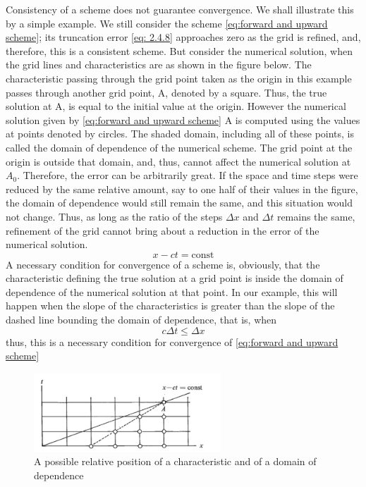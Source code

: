 Consistency of a scheme does not guarantee conver­gence. We shall illustrate this by a simple example. We still consider the scheme \ref{eq:forward and upward scheme}; its truncation error \ref{eq: 2.4.8} approaches zero as the grid is refined, and, there­fore, this is a consistent scheme. But consider the numerical solution, when the grid lines and character­istics are as shown in the figure below. The characteristic passing through the grid point taken as the origin in this example passes through another grid point, A, denoted by a square. Thus, the true solution at A, is equal to the initial value at the origin. However the numerical solution given by \ref{eq:forward and upward scheme} A is computed using the values at points denoted by circles. The shaded domain, including all of these points, is called the domain of dependence of the numerical scheme. The grid point at the origin is outside that domain, and, thus, cannot affect the numerical solution at $A_0$. Therefore, the error can be arbitrarily great. If the space and time steps were reduced by the same relative amount, say to one half of their values in the figure, the domain of dependence would still remain the same, and this situation would not change. Thus, as long as the ratio of the steps $\Delta x$ and $\Delta t$ remains the same, refinement of the grid cannot bring about a reduction in the error of the numerical solution.
$$x-ct=\text{const}$$
A necessary condition for convergence of a scheme is, obviously, that the characteristic defining the true solution at a grid point is inside the domain of dependence of the numerical solution at that point. In our example, this will happen when the slope of the characteristics is greater than the slope of the dashed line bounding the domain of dependence, that is, when $$c\Delta t\leq \Delta x$$
thus, this is a necessary condition for convergence of \ref{eq:forward and upward scheme} 
\begin{figure}[h]
    \centering
    \includegraphics[width=7cm]{uploads/Screenshot 2024-11-10 192132.png}
    \caption{A possible relative position of a characteristic and of a domain of dependence}
    \label{fig:grid sol}
\end{figure}
